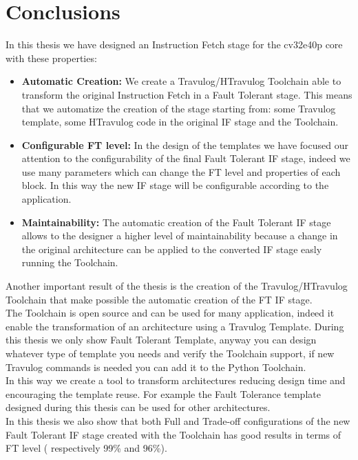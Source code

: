 \chapter{Conclusions}{
	\label{chap:Conclusion}
	In this thesis we have designed an Instruction Fetch stage for the cv32e40p core with these properties:
	\begin{itemize}
	    \item \textbf{Automatic Creation:} We create a Travulog/HTravulog Toolchain able to transform the original Instruction Fetch in a Fault Tolerant stage. This means that we automatize the creation of the stage starting from: some Travulog template, some HTravulog code in the original IF stage and the Toolchain.
	    \item \textbf{Configurable FT level:} In the design of the templates we have focused our attention to the configurability of the final Fault Tolerant IF stage, indeed we use many parameters which can change the FT level and properties of each block. In this way the new IF stage will be configurable according to the application.
	    \item \textbf{Maintainability:} The automatic creation of the Fault Tolerant IF stage allows to the designer a higher level of maintainability because a change in the original architecture can be applied to the converted IF stage easly running the Toolchain. 
	\end{itemize}
	
	Another important result of the thesis is the creation of the Travulog/HTravulog Toolchain that make possible the automatic creation of the FT IF stage.\\
	
	The Toolchain is open source and can be used for many application, indeed it enable the transformation of an architecture using a Travulog Template. During this thesis we only show Fault Tolerant Template, anyway you can design whatever type of template you needs and verify the Toolchain support, if new Travulog commands is needed you can add it to the Python Toolchain.\\
	
	In this way we create a tool to transform architectures reducing design time and encouraging the template reuse. For example the Fault Tolerance template designed during this thesis can be used for other architectures.\\
	
	In this thesis we also show that both Full and Trade-off configurations of the new Fault Tolerant IF stage created with the Toolchain has good results in terms of FT level ( respectively 99\% and 96\%). 
	
}

